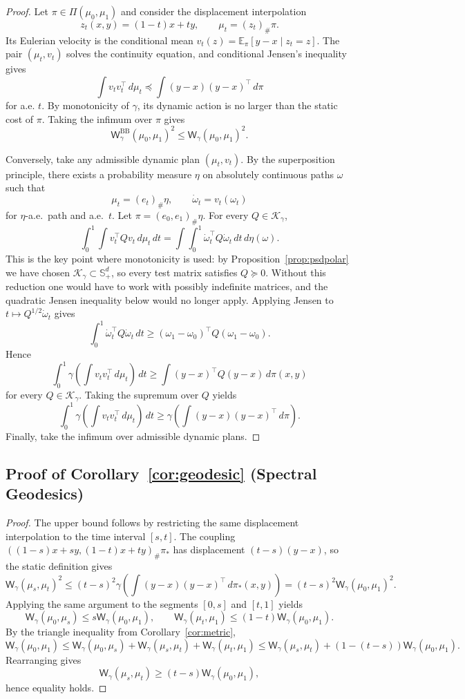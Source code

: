 \documentclass{article}
\newcommand{\Wg}{\mathsf{W}_{\gamma}}
\newcommand{\Wgbb}{\mathsf{W}_{\gamma}^{\mathrm{BB}}}
\newcommand{\cK}{\mathcal K_\gamma}
\begin{document}
\begin{proof}
Let $\pi\in\Pi(\mu_0,\mu_1)$ and consider the displacement interpolation
$$
z_t(x,y)=(1-t)x+ty,
\qquad
\mu_t=(z_t)_\#\pi.
$$
Its Eulerian velocity is the conditional mean
$v_t(z)=\mathbb E_\pi[y-x\mid z_t=z]$. The pair $(\mu_t,v_t)$ solves the
continuity equation, and conditional Jensen's inequality gives
$$
\int v_t v_t^\top\,d\mu_t
\preceq
\int (y-x)(y-x)^\top\,d\pi
$$
for a.e. $t$. By monotonicity of $\gamma$, its dynamic action is no larger
than the static cost of $\pi$. Taking the infimum over $\pi$ gives
$$
\Wgbb(\mu_0,\mu_1)^2\le \Wg(\mu_0,\mu_1)^2.
$$

Conversely, take any admissible dynamic plan $(\mu_t,v_t)$. By the
superposition principle, there exists a probability measure $\eta$ on
absolutely continuous paths $\omega$ such that
$$
\mu_t=(e_t)_\#\eta,
\qquad
\dot\omega_t=v_t(\omega_t)
$$
for $\eta$-a.e.\ path and a.e.\ $t$. Let $\pi=(e_0,e_1)_\#\eta$. For every $Q\in\cK$,
$$
\int_0^1 \int v_t^\top Q v_t\,d\mu_t\,dt
=
\int \int_0^1 \dot\omega_t^\top Q \dot\omega_t\,dt\,d\eta(\omega).
$$
This is the key point where monotonicity is used: by Proposition~\ref{prop:psdpolar} we have chosen $\cK\subset \mathbb S_+^d$, so every test matrix satisfies $Q\succeq 0$. Without this reduction one would have to work with possibly indefinite matrices, and the quadratic Jensen inequality below would no longer apply.
Applying Jensen to $t\mapsto Q^{1/2}\dot\omega_t$ gives
$$
\int_0^1 \dot\omega_t^\top Q \dot\omega_t\,dt
\ge
(\omega_1-\omega_0)^\top Q(\omega_1-\omega_0).
$$
Hence
$$
\int_0^1 \gamma\!\left(\int v_t v_t^\top\,d\mu_t\right)\,dt
\ge
\int (y-x)^\top Q(y-x)\,d\pi(x,y)
$$
for every $Q\in\cK$. Taking the supremum over $Q$ yields
$$
\int_0^1 \gamma\!\left(\int v_t v_t^\top\,d\mu_t\right)\,dt
\ge
\gamma\!\left(\int (y-x)(y-x)^\top\,d\pi\right).
$$
Finally, take the infimum over admissible dynamic plans.
\end{proof}

\subsection{Proof of Corollary~\ref{cor:geodesic} (Spectral Geodesics)}

\begin{proof}
The upper bound follows by restricting the same displacement interpolation to
the time interval $[s,t]$. The coupling
$((1-s)x+sy,(1-t)x+ty)_\#\pi_*$ has displacement $(t-s)(y-x)$, so the static
definition gives
$$
\Wg(\mu_s,\mu_t)^2\le (t-s)^2 \gamma\!\left(\int (y-x)(y-x)^\top\,d\pi_*(x,y)\right)
=(t-s)^2\Wg(\mu_0,\mu_1)^2.
$$
Applying the same argument to the segments $[0,s]$ and $[t,1]$ yields
$$
\Wg(\mu_0,\mu_s)\le s\Wg(\mu_0,\mu_1),
\qquad
\Wg(\mu_t,\mu_1)\le (1-t)\Wg(\mu_0,\mu_1).
$$
By the triangle inequality from Corollary~\ref{cor:metric},
$$
\Wg(\mu_0,\mu_1)
\le
\Wg(\mu_0,\mu_s)+\Wg(\mu_s,\mu_t)+\Wg(\mu_t,\mu_1)
\le
\Wg(\mu_s,\mu_t)+(1-(t-s))\Wg(\mu_0,\mu_1).
$$
Rearranging gives
$$
\Wg(\mu_s,\mu_t)\ge (t-s)\Wg(\mu_0,\mu_1),
$$
hence equality holds.
\end{proof}
\end{document}
